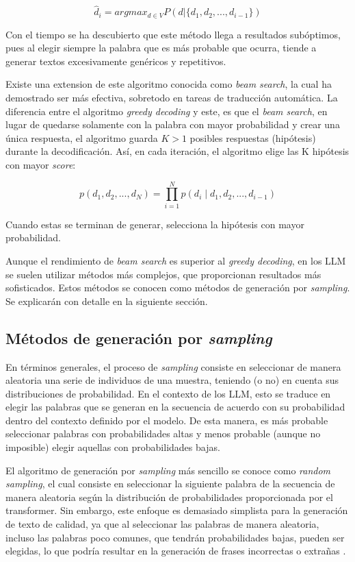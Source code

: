 \documentclass[11pt,spanish,listoffigures,listoftables]{tfgetsinf}
\begin{document}
\begin{equation}
\hat{d}_i = argmax_{d \in V} P(d | \{d_1, d_2, ..., d_{i-1}\})
\end{equation}

Con el tiempo se ha descubierto que este método llega a resultados subóptimos, pues al elegir siempre la palabra que es más probable que ocurra, tiende a generar textos excesivamente genéricos y repetitivos.

Existe una extension de este algoritmo conocida como \textit{beam search}, la cual ha demostrado ser más efectiva, sobretodo en tareas de traducción automática. La diferencia entre el algoritmo \textit{greedy decoding} y este, es que el \textit{beam search}, en lugar de quedarse solamente con la palabra con mayor probabilidad y crear una única respuesta, el algoritmo guarda $K > 1$ posibles respuestas (hipótesis) durante la decodificación. Así, en cada iteración, el algoritmo elige las K hipótesis con mayor \textit{score}:

\begin{equation}
p(d_1, d_2, ..., d_N) = \prod_{i = 1}^{N} p(d_i \mid d_1, d_2, ..., d_{i-1})
\end{equation}

Cuando estas se terminan de generar, selecciona la hipótesis con mayor probabilidad.

Aunque el rendimiento de \textit{beam search} es superior al \textit{greedy decoding}, en los LLM se suelen utilizar métodos más complejos, que proporcionan resultados más sofisticados. Estos métodos se conocen como métodos de generación por \textit{sampling}. Se explicarán con detalle en la siguiente sección.

\subsection{Métodos de generación por \textit{sampling}}

En términos generales, el proceso de \textit{sampling} consiste en seleccionar de manera aleatoria una serie de individuos de una muestra, teniendo (o no) en cuenta sus distribuciones de probabilidad. En el contexto de los LLM, esto se traduce en elegir las palabras que se generan en la secuencia de acuerdo con su probabilidad dentro del contexto definido por el modelo. De esta manera, es más probable seleccionar palabras con probabilidades altas y menos probable (aunque no imposible) elegir aquellas con probabilidades bajas.

 El algoritmo de generación por \textit{sampling} más sencillo se conoce como \textit{random sampling}, el cual consiste en seleccionar la siguiente palabra de la secuencia de manera aleatoria según la distribución de probabilidades proporcionada por el transformer. Sin embargo, este enfoque es demasiado simplista para la generación de texto de calidad, ya que al seleccionar las palabras de manera aleatoria, incluso las palabras poco comunes, que tendrán probabilidades bajas, pueden ser elegidas, lo que podría resultar en la generación de frases incorrectas o extrañas \cite{jurafsky2023speech}.
\end{document}
